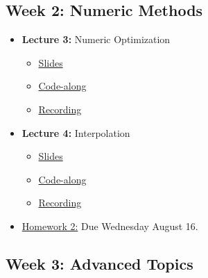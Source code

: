 \documentclass[
]{book}
\providecommand{\tightlist}{%
  \setlength{\itemsep}{0pt}\setlength{\parskip}{0pt}}
\begin{document}
\hypertarget{week-2-numeric-methods}{%
\subsection{Week 2: Numeric Methods}\label{week-2-numeric-methods}}

\begin{itemize}
\tightlist
\item
  \textbf{Lecture 3:} Numeric Optimization

  \begin{itemize}
  \tightlist
  \item
    \href{https://kevinghunt.github.io/ComputationCamp/lectures/Lecture3.html}{Slides}
  \item
    \href{https://kevinghunt.github.io/ComputationCamp/codealongs/CodeAlong3.jl}{Code-along}
  \item
    \href{https://uwmadison.zoom.us/rec/share/xD1LsrLsUF8XtJUjPTVDA_2d52EKgQTF1a6Dc3lBOSB7JlRk4PMUi_h0oMRnMtb5.VW6mJ7BkoiC6riUk}{Recording}
  \end{itemize}
\item
  \textbf{Lecture 4:} Interpolation

  \begin{itemize}
  \tightlist
  \item
    \href{https://kevinghunt.github.io/ComputationCamp/lectures/Lecture4.html}{Slides}
  \item
    \href{https://kevinghunt.github.io/ComputationCamp/codealongs/CodeAlong4.jl}{Code-along}
  \item
    \href{https://uwmadison.zoom.us/rec/share/YNnLYBVpnTSQsMTHQGDDWx2n89gURdYXzVWM8dRyV4o91bAfmCkC8q1IT3f-jo3B.msXmwKB-ZcXcIZRL}{Recording}
  \end{itemize}
\item
  \href{https://kevinghunt.github.io/ComputationCamp/homeworks/homework2.html}{Homework 2:} Due Wednesday August 16.
\end{itemize}

\hypertarget{week-3-advanced-topics}{%
\subsection{Week 3: Advanced Topics}\label{week-3-advanced-topics}}
\end{document}
